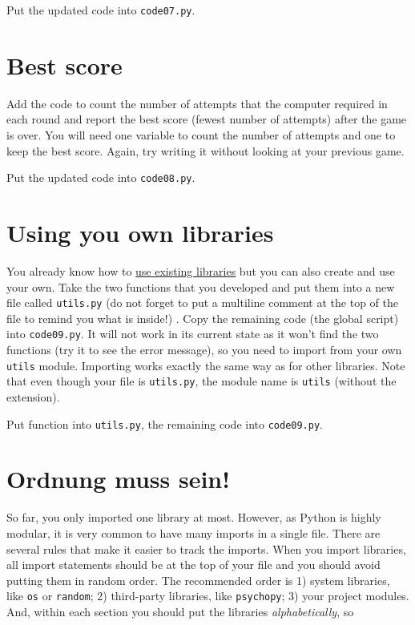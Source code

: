 \documentclass[
]{book}
\begin{document}
Put the updated code into \texttt{code07.py}.

\hypertarget{best-score-1}{%
\section{Best score}\label{best-score-1}}

Add the code to count the number of attempts that the computer required in each round and report the best score (fewest number of attempts) after the game is over. You will need one variable to count the number of attempts and one to keep the best score. Again, try writing it without looking at your previous game.

Put the updated code into \texttt{code08.py}.

\hypertarget{using-you-own-libraries}{%
\section{Using you own libraries}\label{using-you-own-libraries}}

You already know how to \protect\hyperlink{using-libraries}{use existing libraries} but you can also create and use your own. Take the two functions that you developed and put them into a new file called \texttt{utils.py} (do not forget to put a multiline comment at the top of the file to remind you what is inside!) . Copy the remaining code (the global script) into \texttt{code09.py}. It will not work in its current state as it won't find the two functions (try it to see the error message), so you need to import from your own \texttt{utils} module. Importing works exactly the same way as for other libraries. Note that even though your file is \texttt{utils.py}, the module name is \texttt{utils} (without the extension).

Put function into \texttt{utils.py}, the remaining code into \texttt{code09.py}.

\hypertarget{keep-imports-tidy}{%
\section{Ordnung muss sein!}\label{keep-imports-tidy}}

So far, you only imported one library at most. However, as Python is highly modular, it is very common to have many imports in a single file. There are several rules that make it easier to track the imports. When you import libraries, all import statements should be at the top of your file and you should avoid putting them in random order. The recommended order is 1) system libraries, like \texttt{os} or \texttt{random}; 2) third-party libraries, like \texttt{psychopy}; 3) your project modules. And, within each section you should put the libraries \emph{alphabetically}, so
\end{document}
